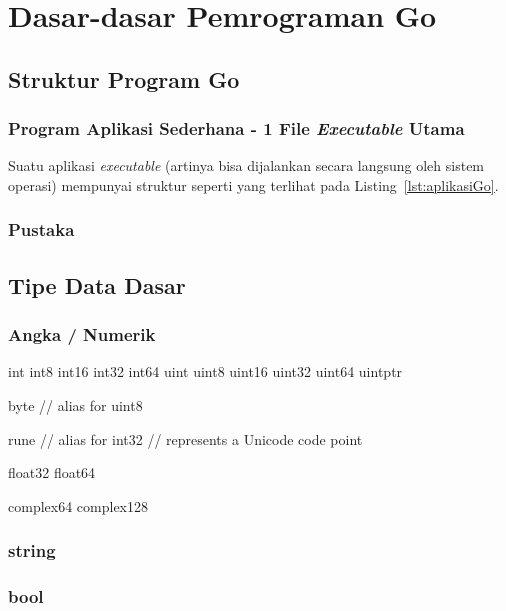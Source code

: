 \chapter{Dasar-dasar Pemrograman Go}

\section{Struktur Program Go}

\subsection{Program Aplikasi Sederhana - 1 File \textit{Executable} Utama}

Suatu aplikasi \textit{executable} (artinya bisa dijalankan secara langsung oleh sistem operasi) mempunyai struktur seperti yang terlihat pada Listing~\ref{lst:aplikasiGo}.



\subsection{Pustaka}


\section{Tipe Data Dasar}

\subsection{Angka / Numerik}

int  int8  int16  int32  int64
uint uint8 uint16 uint32 uint64 uintptr

byte // alias for uint8

rune // alias for int32
     // represents a Unicode code point

float32 float64

complex64 complex128


\subsection{string}

\subsection{bool}



